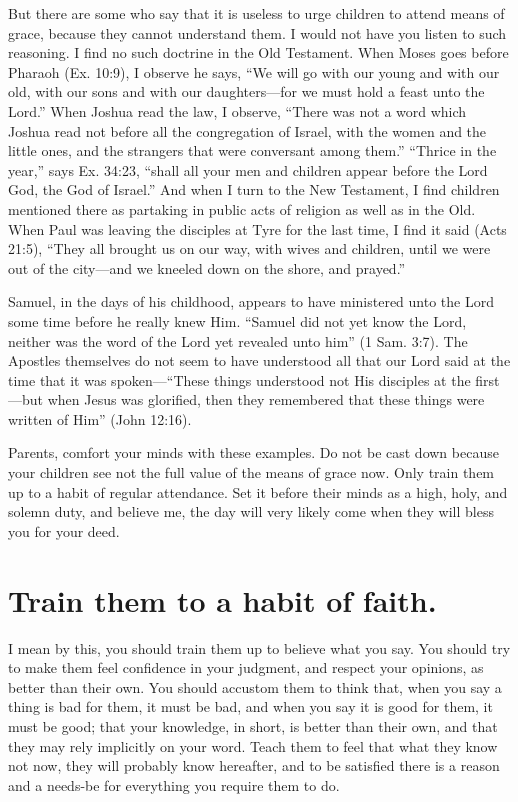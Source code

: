\documentclass[
]{book}
\begin{document}
But there are some who say that it is useless to urge children to attend means of grace, because they cannot understand them. I would not have you listen to such reasoning. I find no such doctrine in the Old Testament. When Moses goes before Pharaoh (Ex. 10:9), I observe he says, ``We will go with our young and with our old, with our sons and with our daughters---for we must hold a feast unto the Lord.'' When Joshua read the law, I observe, ``There was not a word which Joshua read not before all the congregation of Israel, with the women and the little ones, and the strangers that were conversant among them.'' ``Thrice in the year,'' says Ex. 34:23, ``shall all your men and children appear before the Lord God, the God of Israel.'' And when I turn to the New Testament, I find children mentioned there as partaking in public acts of religion as well as in the Old. When Paul was leaving the disciples at Tyre for the last time, I find it said (Acts 21:5), ``They all brought us on our way, with wives and children, until we were out of the city---and we kneeled down on the shore, and prayed.''

Samuel, in the days of his childhood, appears to have ministered unto the Lord some time before he really knew Him. ``Samuel did not yet know the Lord, neither was the word of the Lord yet revealed unto him'' (1 Sam. 3:7). The Apostles themselves do not seem to have understood all that our Lord said at the time that it was spoken---``These things understood not His disciples at the first---but when Jesus was glorified, then they remembered that these things were written of Him'' (John 12:16).

Parents, comfort your minds with these examples. Do not be cast down because your children see not the full value of the means of grace now. Only train them up to a habit of regular attendance. Set it before their minds as a high, holy, and solemn duty, and believe me, the day will very likely come when they will bless you for your deed.

\hypertarget{train-them-to-a-habit-of-faith.}{%
\chapter{Train them to a habit of faith.}\label{train-them-to-a-habit-of-faith.}}

I mean by this, you should train them up to believe what you say. You should try to make them feel confidence in your judgment, and respect your opinions, as better than their own. You should accustom them to think that, when you say a thing is bad for them, it must be bad, and when you say it is good for them, it must be good; that your knowledge, in short, is better than their own, and that they may rely implicitly on your word. Teach them to feel that what they know not now, they will probably know hereafter, and to be satisfied there is a reason and a needs-be for everything you require them to do.
\end{document}
